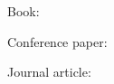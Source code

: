 \documentclass{article}
\begin{document}
Book: \cite{Lamport:SS02}

Conference paper: \cite{Yuan:OSDI14}

Journal article: \cite{Imine:TCS06}



\end{document}
